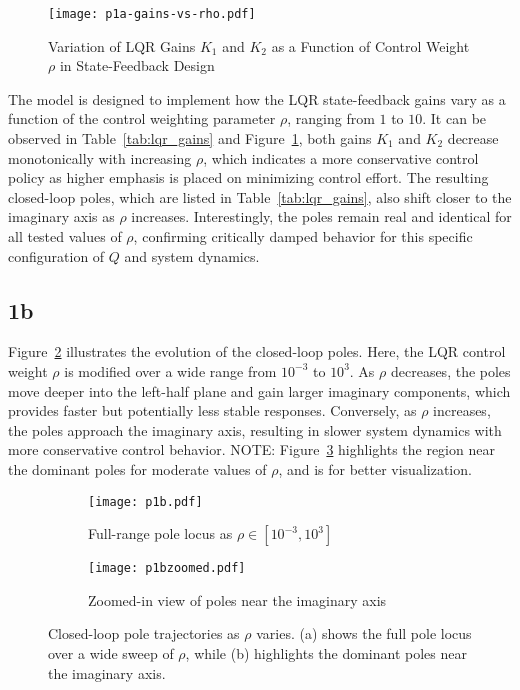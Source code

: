 \documentclass{article}
\begin{document}
\begin{figure}[H]
    \centering    \texttt{[image: p1a-gains-vs-rho.pdf]}
    \caption{Variation of LQR Gains \( K_1 \) and \( K_2 \) as a Function of Control Weight \( \rho \) in State-Feedback Design }
    \label{fig:rho1-10}
\end{figure}
The model is designed to implement how the LQR state-feedback gains vary as a function of the control weighting parameter $\rho$, ranging from $1$ to $10$. It can be observed in Table~\ref{tab:lqr_gains} and Figure~\ref{fig:rho1-10}, both gains $K_1$ and $K_2$ decrease monotonically with increasing $\rho$, which indicates a more conservative control policy as higher emphasis is placed on minimizing control effort. The resulting closed-loop poles, which are listed in Table~\ref{tab:lqr_gains}, also shift closer to the imaginary axis as $\rho$ increases. Interestingly, the poles remain real and identical for all tested values of $\rho$, confirming critically damped behavior for this specific configuration of $Q$ and system dynamics. 

\newpage
\subsection*{1b}
Figure~\ref{fig:p1b_full} illustrates the evolution of the closed-loop poles. Here, the LQR control weight $\rho$ is modified over a wide range from $10^{-3}$ to $10^3$. As $\rho$ decreases, the poles move deeper into the left-half plane and gain larger imaginary components, which provides faster but potentially less stable responses. Conversely, as $\rho$ increases, the poles approach the imaginary axis, resulting in slower system dynamics with more conservative control behavior.
NOTE: Figure~\ref{fig:p1b_zoom}  highlights the region near the dominant poles for moderate values of $\rho$, and is for better visualization.
\begin{figure}[H]
    \centering
    \begin{subfigure}[t]{0.45\textwidth}
        \centering
        \texttt{[image: p1b.pdf]}
        \caption{Full-range pole locus as $\rho \in [10^{-3}, 10^3]$}
        \label{fig:p1b_full}
    \end{subfigure}
    \hfill
    \begin{subfigure}[t]{0.45\textwidth}
        \centering
        \texttt{[image: p1bzoomed.pdf]}
        \caption{Zoomed-in view of poles near the imaginary axis}
        \label{fig:p1b_zoom}
    \end{subfigure}
    \caption{Closed-loop pole trajectories as $\rho$ varies. 
    (a) shows the full pole locus over a wide sweep of $\rho$, while 
    (b) highlights the dominant poles near the imaginary axis.}
    \label{fig:rho_pole_locus}
\end{figure}
\end{document}
